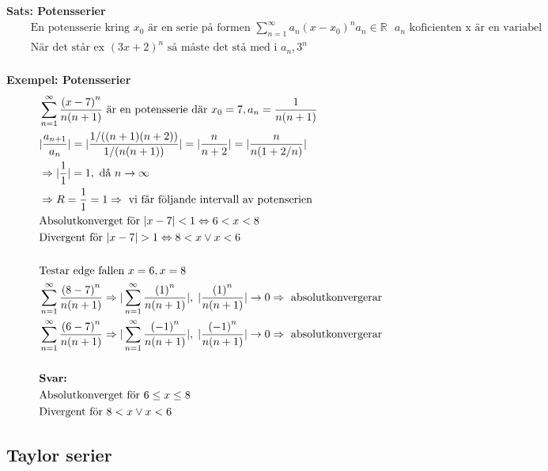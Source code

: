 \textbf{Sats: Potensserier}
\begin{align*}
  &\quad  \text{En potensserie kring } x_0 \text{ är en serie på formen }
  \displaystyle\sum_{n=1}^{\infty}a_n{(x-x_0)}^n a_n \in \mathbb{R} \text{ $a_n$ koficienten x är en variabel} \\
  &\quad  \text{När det står ex } {(3x+2)}^n \text{ så måste det stå med i } a_n, 3^n \\
\end{align*}

\textbf{Exempel: Potensserier}
\begin{align*}
  &\quad  \displaystyle\sum_{n=1}^{\infty}\frac{{(x-7)}^n}{n(n+1)} \text{ är en potensserie där } 
  x_0=7, a_n=\frac{1}{n(n+1)} \\
  &\quad  |\frac{a_{n+1}}{a_n}| = |\frac{1/((n+1)(n+2))}{1/(n(n+1))}| = |\frac{n}{n+2}| =
  |\frac{n}{n(1+2/n)}| \\
  &\quad  \Rightarrow |\frac{1}{1}| = 1, \text{ då } n \to \infty \\
  &\quad  \Rightarrow R=\frac{1}{1}=1 \Rightarrow \text{ vi får följande intervall av potenserien} \\
  &\quad  \text{Absolutkonverget för } |x-7|<1 \Leftrightarrow 6<x<8 \\
  &\quad  \text{Divergent för } |x-7|>1 \Leftrightarrow 8<x \lor x<6 \\
  &\quad  \\
  &\quad  \text{Testar edge fallen } x=6, x=8 \\
  &\quad  \displaystyle\sum_{n=1}^{\infty}\frac{{(8-7)}^n}{n(n+1)} \Rightarrow
  |\displaystyle\sum_{n=1}^{\infty}\frac{{(1)}^n}{n(n+1)}|, \; |\frac{{(1)}^n}{n(n+1)}|\to0
  \Rightarrow \text{ absolutkonvergerar} \\
  &\quad  \displaystyle\sum_{n=1}^{\infty}\frac{{(6-7)}^n}{n(n+1)} \Rightarrow
  |\displaystyle\sum_{n=1}^{\infty}\frac{{(-1)}^n}{n(n+1)}|, \; |\frac{{(-1)}^n}{n(n+1)}|\to0
  \Rightarrow \text{ absolutkonvergerar} \\
  &\quad  \\
  &\quad  \text{\textbf{Svar:} } \\
  &\quad  \text{Absolutkonverget för } 6\leq x\leq 8 \\
  &\quad  \text{Divergent för } 8<x \lor x<6 \\
\end{align*}


\subsection{Taylor serier}

